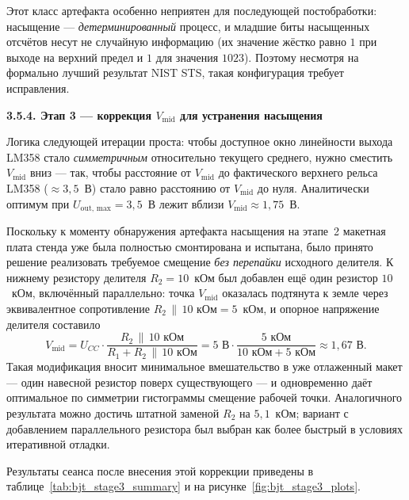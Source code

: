 Этот класс артефакта особенно неприятен для последующей постобработки: насыщение ---
\emph{детерминированный} процесс, и младшие биты насыщенных отсчётов несут не
случайную информацию (их значение жёстко равно $1$ при выходе на верхний предел и
$1$ для значения $1023$). Поэтому несмотря на формально лучший результат NIST STS,
такая конфигурация требует исправления.

\textbf{3.5.4. Этап 3 --- коррекция $V_\mathrm{mid}$ для устранения насыщения}

Логика следующей итерации проста: чтобы доступное окно линейности выхода LM358 стало
\emph{симметричным} относительно текущего среднего, нужно сместить $V_\mathrm{mid}$
вниз --- так, чтобы расстояние от $V_\mathrm{mid}$ до фактического верхнего рельса
LM358 (${\approx}3{,}5$~В) стало равно расстоянию от $V_\mathrm{mid}$ до нуля.
Аналитически оптимум при $U_\mathrm{out,\,max}=3{,}5$~В лежит вблизи
$V_\mathrm{mid}\approx 1{,}75$~В.

Поскольку к моменту обнаружения артефакта насыщения на этапе~2 макетная плата
стенда уже была полностью смонтирована и испытана, было принято решение реализовать
требуемое смещение \emph{без перепайки} исходного делителя. К нижнему резистору
делителя $R_2=10$~кОм был добавлен ещё один резистор $10$~кОм, включённый
параллельно: точка $V_\mathrm{mid}$ оказалась подтянута к земле через эквивалентное
сопротивление $R_2\,\|\,10\text{ кОм} = 5$~кОм, и опорное напряжение делителя
составило
\begin{equation}
  V_\mathrm{mid}
  = U_{CC}\cdot\dfrac{R_2\,\|\,10\text{ кОм}}{R_1+R_2\,\|\,10\text{ кОм}}
  = 5\text{ В}\cdot\dfrac{5\text{ кОм}}{10\text{ кОм}+5\text{ кОм}}
  \approx 1{,}67\text{ В}.
\end{equation}
Такая модификация вносит минимальное вмешательство в уже отлаженный макет ---
один навесной резистор поверх существующего --- и одновременно даёт оптимальное
по симметрии гистограммы смещение рабочей точки. Аналогичного результата можно
достичь штатной заменой $R_2$ на $5{,}1$~кОм; вариант с добавлением параллельного
резистора был выбран как более быстрый в условиях итеративной отладки.

Результаты сеанса после внесения этой коррекции приведены в
таблице~\ref{tab:bjt_stage3_summary} и на рисунке~\ref{fig:bjt_stage3_plots}.

